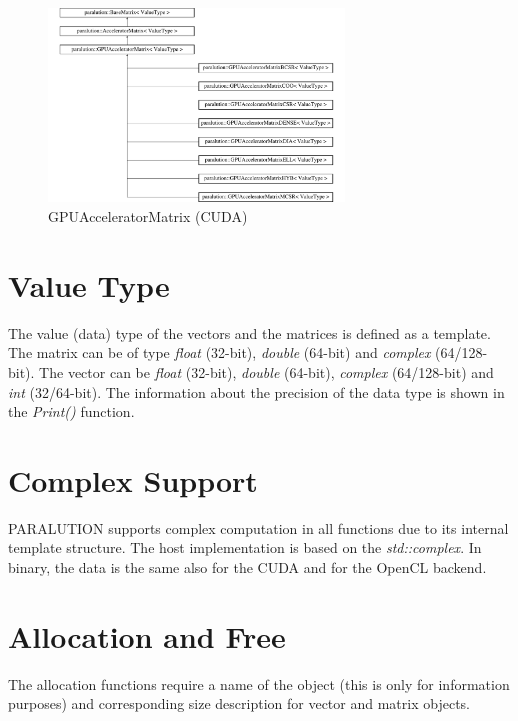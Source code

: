 \begin{figure}[!ht]
\centering
\includegraphics[width=0.7\textwidth]{./fig/body/classparalution_1_1_g_p_u_accelerator_matrix.pdf}
\caption{GPUAcceleratorMatrix (CUDA)}
\label{GPUMatrix}
\end{figure}


\section{Value Type}

The value (data) type of the vectors and the matrices is defined as a template. The matrix can be of type \emph{float} (32-bit), \emph{double} (64-bit) and \emph{complex} (64/128-bit). The vector can be \emph{float} (32-bit), \emph{double} (64-bit), \emph{complex} (64/128-bit) and \emph{int} (32/64-bit). The information about the precision of the data type is shown in the \emph{Print()} function.

\section{Complex Support}
\label{complex-support}

PARALUTION supports complex computation in all functions due to its internal template structure. The host implementation is based on the  \emph{std::complex}. In binary, the data is the same also for the CUDA and for the OpenCL backend.

\section{Allocation and Free}

The allocation functions require a name of the object (this is only for information purposes) and corresponding size description for vector and matrix objects.



